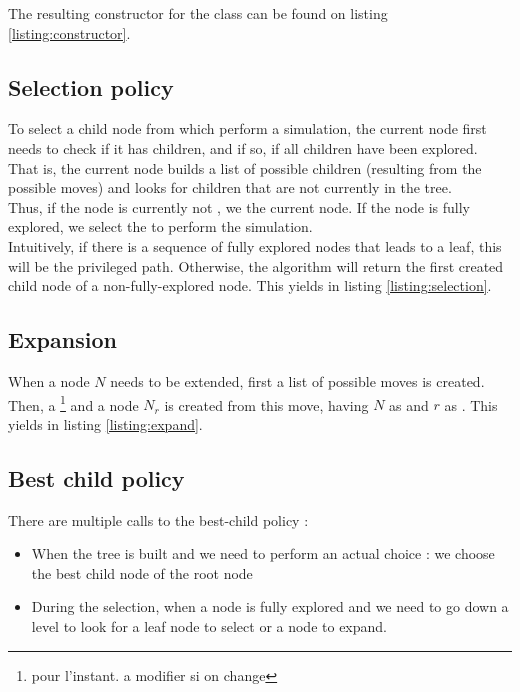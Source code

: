\documentclass[11pt,a4paper]{article}
\begin{document}
The resulting constructor for the class  can be found on listing \ref{listing:constructor}.

\subsection{Selection policy}
To select a child node from which perform a simulation, the current node first needs to check if it has children, and if so, if all children have been explored. That is, the current node builds a list of possible children (resulting from the possible moves) and looks for children that are not currently in the tree. \\

Thus, if the node is currently not , we  the current node. If the node is fully explored, we select the  to perform the simulation. \\

Intuitively, if there is a sequence of fully explored nodes that leads to a leaf, this will be the privileged path. Otherwise, the algorithm will return the first created child node of a non-fully-explored node. This yields in listing \ref{listing:selection}.

\subsection{Expansion}
When a node $N$ needs to be extended, first a list of possible moves is created. Then, a \footnote{pour l'instant. a modifier si on change} and a node $N_r$ is created from this move, having $N$ as  and $r$ as . This yields in listing \ref{listing:expand}.
\subsection{Best child policy}
There are multiple calls to the best-child policy :
\begin{itemize}
    \item When the tree is built and we need to perform an actual choice : we choose the best child node of the root node 
    \item During the selection, when a node is fully explored and we need to go down a level to look for a leaf node to select or a node to expand. \\
\end{itemize}
\end{document}
